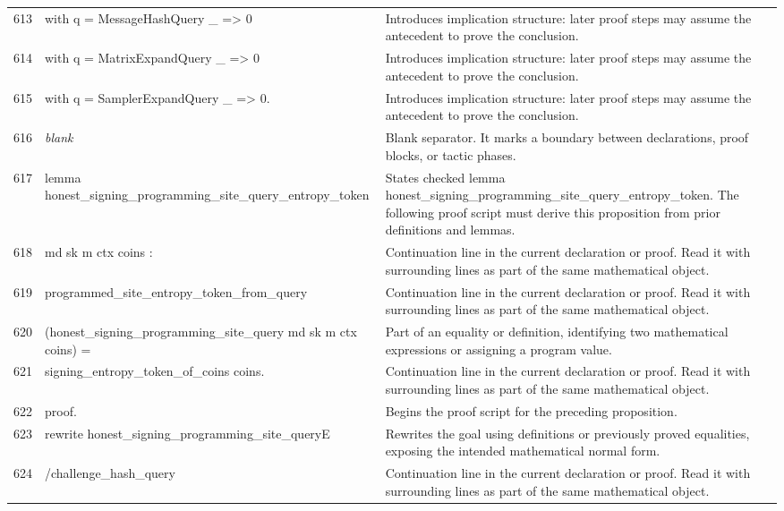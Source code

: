 \documentclass[10pt]{article}
\begin{document}
\begin{longtable}{r L{0.53\textwidth} L{0.37\textwidth}}
613 & {\ttfamily\scriptsize   with q = MessageHashQuery \_ => 0} & Introduces implication structure: later proof steps may assume the antecedent to prove the conclusion. \\
614 & {\ttfamily\scriptsize   with q = MatrixExpandQuery \_ => 0} & Introduces implication structure: later proof steps may assume the antecedent to prove the conclusion. \\
615 & {\ttfamily\scriptsize   with q = SamplerExpandQuery \_ => 0.} & Introduces implication structure: later proof steps may assume the antecedent to prove the conclusion. \\
616 & {\ttfamily\scriptsize \emph{blank}} & Blank separator.  It marks a boundary between declarations, proof blocks, or tactic phases. \\
617 & {\ttfamily\scriptsize lemma honest\_signing\_programming\_site\_query\_entropy\_token} & States checked lemma honest\_signing\_programming\_site\_query\_entropy\_token.  The following proof script must derive this proposition from prior definitions and lemmas. \\
618 & {\ttfamily\scriptsize   md sk m ctx coins :} & Continuation line in the current declaration or proof.  Read it with surrounding lines as part of the same mathematical object. \\
619 & {\ttfamily\scriptsize   programmed\_site\_entropy\_token\_from\_query} & Continuation line in the current declaration or proof.  Read it with surrounding lines as part of the same mathematical object. \\
620 & {\ttfamily\scriptsize     (honest\_signing\_programming\_site\_query md sk m ctx coins) =} & Part of an equality or definition, identifying two mathematical expressions or assigning a program value. \\
621 & {\ttfamily\scriptsize   signing\_entropy\_token\_of\_coins coins.} & Continuation line in the current declaration or proof.  Read it with surrounding lines as part of the same mathematical object. \\
622 & {\ttfamily\scriptsize proof.} & Begins the proof script for the preceding proposition. \\
623 & {\ttfamily\scriptsize rewrite honest\_signing\_programming\_site\_queryE} & Rewrites the goal using definitions or previously proved equalities, exposing the intended mathematical normal form. \\
624 & {\ttfamily\scriptsize         /challenge\_hash\_query} & Continuation line in the current declaration or proof.  Read it with surrounding lines as part of the same mathematical object. \\

\end{longtable}
\end{document}
